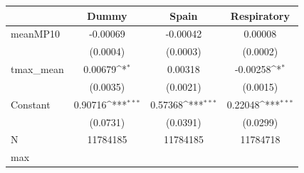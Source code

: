 {
\def\sym#1{\ifmmode^{#1}\else\(^{#1}\)\fi}
\begin{tabular}{l*{3}{c}}
\toprule
            &\multicolumn{1}{c}{Dummy}&\multicolumn{1}{c}{Spain}&\multicolumn{1}{c}{Respiratory}\\
\midrule
meanMP10    &    -0.00069         &    -0.00042         &     0.00008         \\
            &    (0.0004)         &    (0.0003)         &    (0.0002)         \\
tmax\_mean   &     0.00679\sym{*}  &     0.00318         &    -0.00258\sym{*}  \\
            &    (0.0035)         &    (0.0021)         &    (0.0015)         \\
Constant    &     0.90716\sym{***}&     0.57368\sym{***}&     0.22048\sym{***}\\
            &    (0.0731)         &    (0.0391)         &    (0.0299)         \\
\midrule
N           &    11784185         &    11784185         &    11784718         \\
max         &                     &                     &                     \\
\bottomrule
\end{tabular}
}
